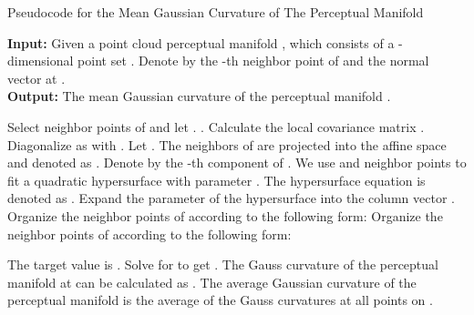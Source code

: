\documentclass[10pt,twocolumn,letterpaper]{article}
\begin{document}
\begin{algorithm*}[t]
\caption{Pseudocode for the Mean Gaussian Curvature of The Perceptual Manifold}
\label{alg5}
\textbf{Input:} Given a point cloud perceptual manifold , which consists of a -dimensional point set . Denote by  the -th neighbor point of  and  the normal vector at . \\
\textbf{Output:} The mean Gaussian curvature of the perceptual manifold . 
\begin{algorithmic}[1] 
\STATE Select  neighbor points  of  and let .
\STATE .
\STATE Calculate the local covariance matrix .
\STATE Diagonalize  as  with .
\STATE Let .
\STATE The  neighbors of  are projected into the affine space  and denoted as .
\STATE Denote by  the -th component  of . We use  and  neighbor points to fit a quadratic hypersurface  with parameter . The hypersurface equation is denoted as .
\STATE Expand the parameter  of the hypersurface into the column vector .
\STATE Organize the  neighbor points  of  according to the following form:
Organize the  neighbor points  of  according to the following form:

\STATE The target value is .
\STATE Solve for  to get .
\STATE The Gauss curvature of the perceptual manifold  at  can be calculated as .
\ENDFOR
\STATE The average Gaussian curvature  of the perceptual manifold  is the average of the Gauss curvatures at all points on .
\end{algorithmic}
\end{algorithm*}
\end{document}
